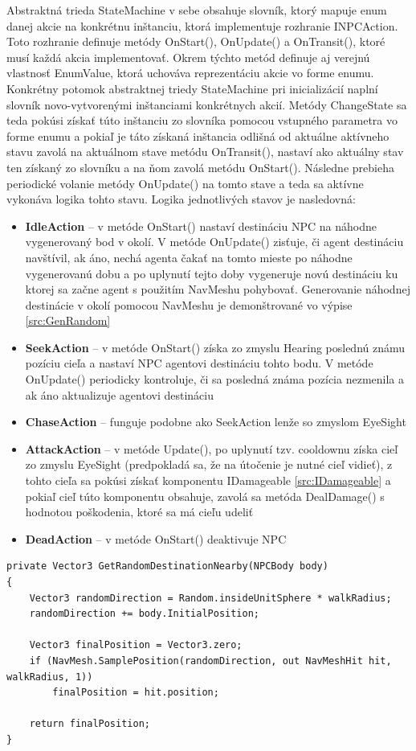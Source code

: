 \documentclass[slovak, master]{diploma}
\begin{document}
Abstraktná trieda StateMachine v sebe obsahuje slovník, ktorý mapuje enum danej akcie na konkrétnu inštanciu, ktorá implementuje rozhranie INPCAction. Toto rozhranie definuje metódy OnStart(), OnUpdate() a OnTransit(), ktoré musí každá akcia implementovať. Okrem týchto metód definuje aj verejnú vlastnosť EnumValue, ktorá uchováva reprezentáciu akcie vo forme enumu. Konkrétny potomok abstraktnej triedy StateMachine pri inicializácií naplní slovník novo-vytvorenými inštanciami konkrétnych akcií. Metódy ChangeState sa teda pokúsi získať túto inštanciu zo slovníka pomocou vstupného parametra vo forme enumu a pokiaľ je táto získaná inštancia odlišná od aktuálne aktívneho stavu zavolá na aktuálnom stave metódu OnTransit(), nastaví ako aktuálny stav ten získaný zo slovníku a na ňom zavolá metódu OnStart(). Následne prebieha periodické volanie metódy OnUpdate() na tomto stave a teda sa aktívne vykonáva logika tohto stavu. Logika jednotlivých stavov je nasledovná:
\begin{itemize}
  \item \textbf{IdleAction} -- v metóde OnStart() nastaví destináciu NPC na náhodne vygenerovaný bod v okolí. V metóde OnUpdate() zisťuje, či agent destináciu navštívil, ak áno, nechá agenta čakať na tomto mieste po náhodne vygenerovanú dobu a po uplynutí tejto doby vygeneruje novú destináciu ku ktorej sa začne agent s použitím NavMeshu pohybovať. Generovanie náhodnej destinácie v okolí pomocou NavMeshu je demonštrované vo výpise \ref{src:GenRandom}
  \item \textbf{SeekAction} -- v metóde OnStart() získa zo zmyslu Hearing poslednú známu pozíciu cieľa a nastaví NPC agentovi destináciu tohto bodu. V metóde OnUpdate() periodicky kontroluje, či sa posledná známa pozícia nezmenila a ak áno aktualizuje agentovi destináciu
  \item \textbf{ChaseAction} -- funguje podobne ako SeekAction lenže so zmyslom EyeSight
  \item \textbf{AttackAction} -- v metóde Update(), po uplynutí tzv. cooldownu získa cieľ zo zmyslu EyeSight (predpokladá sa, že na útočenie je nutné cieľ vidieť), z tohto cieľa sa pokúsi získať komponentu IDamageable \ref{src:IDamageable} a pokiaľ cieľ túto komponentu obsahuje, zavolá sa metóda DealDamage() s hodnotou poškodenia, ktoré sa má cieľu udeliť
  \item \textbf{DeadAction} -- v metóde OnStart() deaktivuje NPC
\end{itemize}

\vspace{8pt}
\begin{lstlisting}[label=src:GenRandom,caption={Generovanie náhodného bodu v okolí NPC pomocou NavMeshu}]
private Vector3 GetRandomDestinationNearby(NPCBody body)
{
    Vector3 randomDirection = Random.insideUnitSphere * walkRadius;
    randomDirection += body.InitialPosition;
    
    Vector3 finalPosition = Vector3.zero;
    if (NavMesh.SamplePosition(randomDirection, out NavMeshHit hit, walkRadius, 1))
        finalPosition = hit.position;

    return finalPosition;
}
\end{lstlisting}
\end{document}
